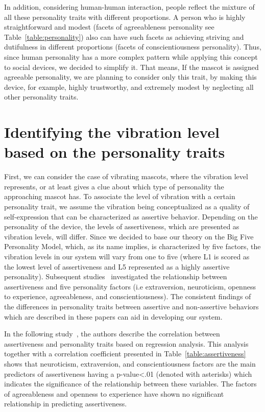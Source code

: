 In addition, considering human-human interaction, people reflect the mixture of all
these personality traits with different proportions.
A person who is highly straightforward and modest (facets of agreeableness personality
see Table~\ref{table:personality}) also can have such facets as achieving striving and dutifulness
in different proportions (facets of conscientiousness personality).
Thus, since human personality has a more complex pattern while
applying this concept to social devices, we decided to simplify it.
That means, If the mascot is assigned agreeable personality, we are planning to consider only this trait,
by making this device, for example, highly trustworthy, and extremely modest by neglecting all other personality traits.

\section{Identifying the vibration level based on the personality traits}
\label{sec:Identifying the vibration level based on the personality traits}

First, we can consider the case of vibrating mascots, where the vibration level
represents, or at least gives a clue about which type of personality the approaching mascot has.
To associate the level of vibration with a certain personality trait,
we assume the vibration being conceptualized as a quality of self-expression
that can be characterized as assertive behavior.
Depending on the personality of the device, the levels of assertiveness,
which are presented as vibration levels, will differ.
Since we decided to base our theory on the Big Five Personality Model, which, as its name implies, is characterized
by five factors, the vibration levels in our system will vary from one to five (where L1 is scored
as the lowest level of assertiveness and L5 represented as a highly assertive personality).
Subsequent studies~\cite{bagherian2016relationship,kirst2011investigating,ramanaiah1993neo,lefevre1981assertiveness}
investigated the relationship between assertiveness and five personality factors (i.e extraversion, neuroticism,
openness to experience, agreeableness, and conscientiousness).
The consistent findings of the differences in personality traits between assertive and
non-assertive behaviors which are described in these papers can aid in developing our system.

In the following study~\cite{bagherian2016relationship}, the authors describe the correlation between
assertiveness and personality traits based on regression analysis.
This analysis together with a correlation coefficient
presented in Table~\ref{table:assertiveness}~\cite{bagherian2016relationship} shows that neuroticism,
extraversion, and conscientiousness factors are the main predictors of assertiveness
having a p-value\textless .01 (denoted with asterisks) which indicates the significance of the
relationship between these variables.
The factors of agreeableness and openness to experience have shown
no significant relationship in predicting assertiveness.

